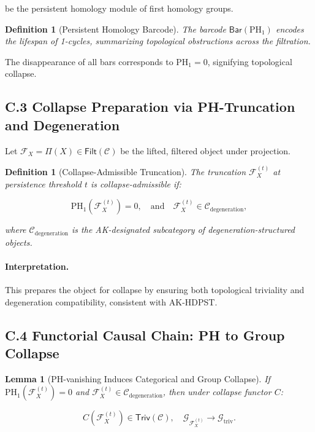 \documentclass[11pt]{article}
\newtheorem{definition}[theorem]{Definition}
\newtheorem{lemma}[theorem]{Lemma}
\begin{document}
be the persistent homology module of first homology groups.

\begin{definition}[Persistent Homology Barcode]
The barcode \( \mathsf{Bar}(\mathrm{PH}_1) \) encodes the lifespan of 1-cycles, summarizing topological obstructions across the filtration.
\end{definition}

The disappearance of all bars corresponds to \( \mathrm{PH}_1 = 0 \), signifying topological collapse.

\subsection*{C.3 Collapse Preparation via PH-Truncation and Degeneration}

Let \( \mathcal{F}_X = \Pi(X) \in \mathsf{Filt}(\mathcal{C}) \) be the lifted, filtered object under projection.

\begin{definition}[Collapse-Admissible Truncation]
The truncation \( \mathcal{F}_X^{(t)} \) at persistence threshold \( t \) is \emph{collapse-admissible} if:

\[
\mathrm{PH}_1(\mathcal{F}_X^{(t)}) = 0, \quad \text{and} \quad \mathcal{F}_X^{(t)} \in \mathcal{C}_{\mathrm{degeneration}},
\]

where \( \mathcal{C}_{\mathrm{degeneration}} \) is the AK-designated subcategory of degeneration-structured objects.
\end{definition}

\paragraph{Interpretation.}
This prepares the object for collapse by ensuring both topological triviality and degeneration compatibility, consistent with AK-HDPST.

\subsection*{C.4 Functorial Causal Chain: PH to Group Collapse}

\begin{lemma}[PH-vanishing Induces Categorical and Group Collapse]
If \( \mathrm{PH}_1(\mathcal{F}_X^{(t)}) = 0 \) and \( \mathcal{F}_X^{(t)} \in \mathcal{C}_{\mathrm{degeneration}} \), then under collapse functor \( C \):

\[
C(\mathcal{F}_X^{(t)}) \in \mathsf{Triv}(\mathcal{C}), \quad \mathcal{G}_{\mathcal{F}_X^{(t)}} \longrightarrow \mathcal{G}_{\mathrm{triv}}.
\]
\end{lemma}
\end{document}
